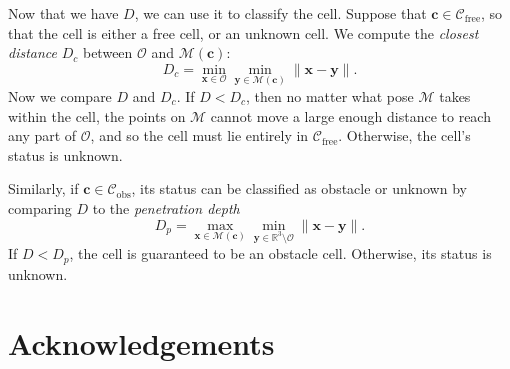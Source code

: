 \documentclass[review]{acmsiggraph}
\newcommand{\cm}{\mathcal{M}}
\newcommand{\by}{\mathbf{y}}
\newcommand{\bx}{\mathbf{x}}
\newcommand{\bc}{\mathbf{c}}
\newcommand{\Cfree}{\mathcal{C}_{\mathrm{free}}}
\newcommand{\Cobs}{\mathcal{C}_{\mathrm{obs}}}
\newcommand{\co}{\mathcal{O}}
\begin{document}

Now that we have $D$, we can use it to classify the cell. Suppose that $\bc \in \Cfree$, so that the cell is either a free cell, or an unknown cell. We compute the \emph{closest distance} $D_c$ between $\co$ and $\cm(\bc)$:
$$D_c = \min_{\bx \in \co} \min_{\by \in \cm(\bc)} \|\bx-\by\|.$$
Now we compare $D$ and $D_c$. If $D < D_c$, then no matter what pose $\cm$ takes within the cell, the points on $\cm$ cannot move a large enough distance to reach any part of $\co$, and so the cell must lie entirely in $\Cfree$. Otherwise, the cell's status is unknown.

Similarly, if $\bc \in \Cobs$, its status can be classified as obstacle or unknown by comparing $D$ to the \emph{penetration depth}
$$D_p = \max_{\bx \in \cm(\bc)} \min_{\by \in \mathbb{R}^3\setminus \co} \|\bx - \by\|.$$
If $D < D_p$, the cell is guaranteed to be an obstacle cell. Otherwise, its status is unknown.
\section*{Acknowledgements}



\end{document}
